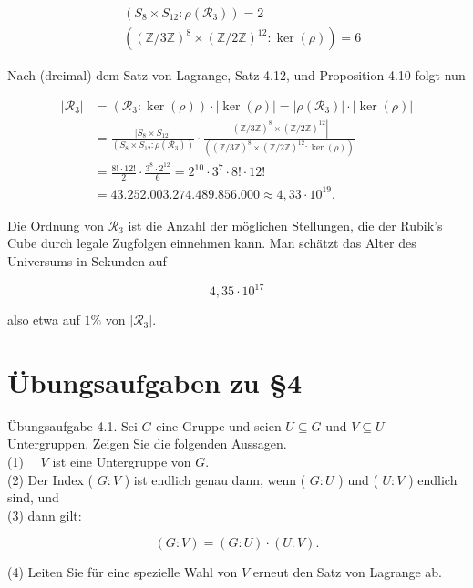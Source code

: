 \documentclass[10pt, letterpaper]{article}
\begin{document}
$$
\begin{aligned}
& \left(S_{8} \times S_{12}: \rho\left(\mathscr{R}_{3}\right)\right)=2 \\
& \left((\mathbb{Z} / 3 \mathbb{Z})^{8} \times(\mathbb{Z} / 2 \mathbb{Z})^{12}: \operatorname{ker}(\rho)\right)=6
\end{aligned}
$$

Nach (dreimal) dem Satz von Lagrange, Satz 4.12, und Proposition 4.10 folgt nun

$$
\begin{aligned}
\left|\mathscr{R}_{3}\right| & =\left(\mathscr{R}_{3}: \operatorname{ker}(\rho)\right) \cdot|\operatorname{ker}(\rho)|=\left|\rho\left(\mathscr{R}_{3}\right)\right| \cdot|\operatorname{ker}(\rho)| \\
& =\frac{\left|S_{8} \times S_{12}\right|}{\left(S_{8} \times S_{12}: \rho\left(\mathscr{R}_{3}\right)\right)} \cdot \frac{\left|(\mathbb{Z} / 3 \mathbb{Z})^{8} \times(\mathbb{Z} / 2 \mathbb{Z})^{12}\right|}{\left((\mathbb{Z} / 3 \mathbb{Z})^{8} \times(\mathbb{Z} / 2 \mathbb{Z})^{12}: \operatorname{ker}(\rho)\right)} \\
& =\frac{8!\cdot 12!}{2} \cdot \frac{3^{8} \cdot 2^{12}}{6}=2^{10} \cdot 3^{7} \cdot 8!\cdot 12! \\
& =43.252 .003 .274 .489 .856 .000 \approx 4,33 \cdot 10^{19} .
\end{aligned}
$$

Die Ordnung von $\mathscr{R}_{3}$ ist die Anzahl der möglichen Stellungen, die der Rubik's Cube durch legale Zugfolgen einnehmen kann. Man schätzt das Alter des Universums in Sekunden auf

$$
4,35 \cdot 10^{17}
$$

also etwa auf $1 \%$ von $\left|\mathscr{R}_{3}\right|$.

\section*{Übungsaufgaben zu §4}
Übungsaufgabe 4.1. Sei $G$ eine Gruppe und seien $U \subseteq G$ und $V \subseteq U$ Untergruppen. Zeigen Sie die folgenden Aussagen.\\
(1) $\quad V$ ist eine Untergruppe von $G$.\\
(2) Der Index ( $G: V$ ) ist endlich genau dann, wenn ( $G: U$ ) und ( $U: V$ ) endlich sind, und\\
(3) dann gilt:

$$
(G: V)=(G: U) \cdot(U: V) .
$$

(4) Leiten Sie für eine spezielle Wahl von $V$ erneut den Satz von Lagrange ab.
\end{document}
